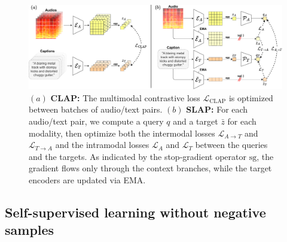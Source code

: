 \documentclass{article}
\newcommand{\LL}{\mathcal{L}}
\begin{document}
\begin{figure}[t]
    \centering
    \includegraphics[width=1\textwidth]{figs/slap-ab}
    \caption{
        $(a)$ \textbf{CLAP:} The multimodal contrastive loss $\LL_{\text{CLAP}}$ is optimized between batches of audio/text pairs.
        $(b)$ \textbf{SLAP:} For each audio/text pair, we compute a query $q$ and a target $\bar{z}$ for each modality, then optimize both the intermodal losses $\LL_{A \to T}$ and $\LL_{T \to A}$ and the intramodal losses $\LL_A$ and $\LL_T$ between the queries and the targets.
        As indicated by the stop-gradient operator $\text{sg}$, the gradient flows only through the context branches, while the target encoders are updated via EMA.
    }
    \label{fig:model}
\end{figure}



\subsection{Self-supervised learning without negative samples}
\end{document}
